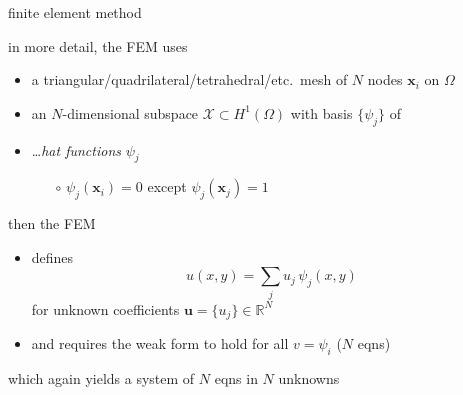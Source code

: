 \documentclass[hide notes,intlimits,usenames,dvipsnames]{beamer}
\newcommand{\RR}{\mathbb{R}}
\newcommand{\bu}{\mathbf{u}}
\newcommand{\bx}{\mathbf{x}}
\begin{document}
\begin{frame}{finite element method}

in more detail, the FEM uses
\begin{itemize}
\item a {\footnotesize triangular/quadrilateral/tetrahedral/etc.}~mesh of $N$ nodes $\bx_i$ on $\Omega$
\item an $N$-dimensional subspace $\mathcal{X} \subset H^1(\Omega)$ with basis $\{\psi_j\}$ of
\item \begin{minipage}[t]{55mm}
\dots \emph{hat functions} $\psi_j$
	\begin{itemize}
	\item[$\circ$] $\psi_j(\bx_i)=0$ except $\psi_j(\bx_j)=1$
	\end{itemize}
\end{minipage}
\quad
\begin{minipage}[t]{35mm}
\vspace{-4mm}
\begin{tikzpicture}[scale=0.6, z={(.707,.3)}, baseline]

\end{tikzpicture}
\end{minipage}
\end{itemize}

\vspace{-3mm}
then the FEM
\begin{itemize}
\item defines
   $$u(x,y) = \sum_j u_{j}\, \psi_{j}(x,y)$$
for unknown coefficients $\bu=\{u_j\}\in \RR^N$
\item and requires the weak form to hold for all $v=\psi_i$ ($N$ eqns)
\end{itemize}

\medskip
which again yields a system of $N$ eqns in $N$ unknowns
\end{frame}
\end{document}
